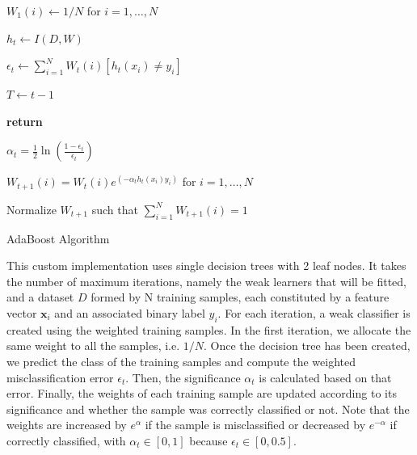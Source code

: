 \documentclass[conference]{IEEEtran}
\begin{document}
\begin{algorithm}
  $W_1(i) \leftarrow 1/N$ for $i=1,\dots,N$ %

    {
        $h_t \leftarrow I(D,W)$

        $\epsilon_t \leftarrow \sum^N_{i=1}W_t(i)[h_t(x_i)\neq y_i]$

        		{
		
		$T \leftarrow t-1$
		
		\bf{return}
		}
		
	$\alpha_t = \frac{1}{2}\ln \left( \frac{1-\epsilon_t}{\epsilon_t} \right)$
	
	
	 $W_{t+1}(i) = W_t(i) e^{(-\alpha_th_t(x_i)y_i)}$ for $i=1,\dots,N$
	
	 Normalize $W_{t+1}$ such that $\sum^N_{i=1}W_{t+1}(i)=1$
	
    }
\caption{AdaBoost Algorithm}
\end{algorithm}

This custom implementation uses single decision trees with 2 leaf nodes. It takes the number of maximum iterations, namely the weak learners that will be fitted, and a dataset $D$ formed by N training samples, each constituted by a feature vector $\boldsymbol{x}_i$ and an associated binary label $y_i$. For each iteration, a weak classifier is created using the weighted training samples. In the first iteration, we allocate the same weight to all the samples, i.e. $1/N$. Once the decision tree has been created, we predict the class of the training samples and compute the weighted misclassification error $\epsilon_t$. Then, the significance $\alpha_t$ is calculated based on that error. Finally, the weights of each training sample are updated according to its significance and whether the sample was correctly classified or not. Note that the weights are increased by $e^{\alpha}$ if the sample is misclassified or decreased by $e^{-\alpha}$ if correctly classified, with  $\alpha_t \in [0,1]$ because $\epsilon_t \in [0,0.5]$.
\end{document}
